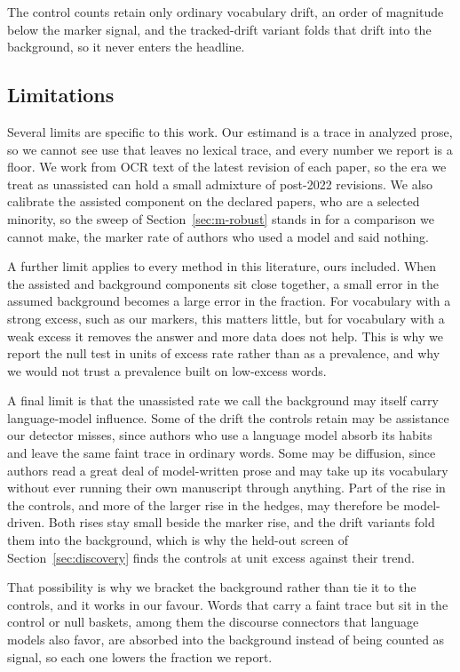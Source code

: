 \documentclass[twocolumn]{aastex631}
\begin{document}
The control counts retain only ordinary vocabulary drift, an order of magnitude below the marker signal, and the tracked-drift variant folds that drift into the background, so it never enters the headline.

\subsection{Limitations}\label{sec:limits}

Several limits are specific to this work. Our estimand is a trace in analyzed prose, so we cannot see use that leaves no lexical trace, and every number we report is a floor. We work from OCR text of the latest revision of each paper, so the era we treat as unassisted can hold a small admixture of post-2022 revisions. We also calibrate the assisted component on the declared papers, who are a selected minority, so the sweep of Section~\ref{sec:m-robust} stands in for a comparison we cannot make, the marker rate of authors who used a model and said nothing.

A further limit applies to every method in this literature, ours included. When the assisted and background components sit close together, a small error in the assumed background becomes a large error in the fraction. For vocabulary with a strong excess, such as our markers, this matters little, but for vocabulary with a weak excess it removes the answer and more data does not help. This is why we report the null test in units of excess rate rather than as a prevalence, and why we would not trust a prevalence built on low-excess words.

A final limit is that the unassisted rate we call the background may itself carry language-model influence. Some of the drift the controls retain may be assistance our detector misses, since authors who use a language model absorb its habits and leave the same faint trace in ordinary words. Some may be diffusion, since authors read a great deal of model-written prose and may take up its vocabulary without ever running their own manuscript through anything. Part of the rise in the controls, and more of the larger rise in the hedges, may therefore be model-driven. Both rises stay small beside the marker rise, and the drift variants fold them into the background, which is why the held-out screen of Section~\ref{sec:discovery} finds the controls at unit excess against their trend.

That possibility is why we bracket the background rather than tie it to the controls, and it works in our favour. Words that carry a faint trace but sit in the control or null baskets, among them the discourse connectors that language models also favor, are absorbed into the background instead of being counted as signal, so each one lowers the fraction we report.
\end{document}
